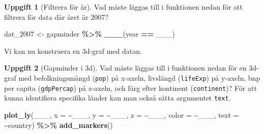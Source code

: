 \documentclass[
]{book}
\newenvironment{Shaded}{\begin{snugshade}}{\end{snugshade}}
\newcommand{\AttributeTok}[1]{\textcolor[rgb]{0.13,0.29,0.53}{#1}}
\newcommand{\FunctionTok}[1]{\textcolor[rgb]{0.13,0.29,0.53}{\textbf{#1}}}
\newcommand{\NormalTok}[1]{#1}
\newcommand{\OtherTok}[1]{\textcolor[rgb]{0.56,0.35,0.01}{#1}}
\newcommand{\SpecialCharTok}[1]{\textcolor[rgb]{0.81,0.36,0.00}{\textbf{#1}}}
\theoremstyle{definition}
\theoremstyle{definition}
\theoremstyle{definition}
\newtheorem{exercise}{Uppgift}[chapter]
\theoremstyle{definition}
\theoremstyle{remark}
\begin{document}
\begin{exercise}[Filtrera för år]

Vad måste läggas till i funktionen nedan för att filtrera för data där året är 2007?

\begin{Shaded}
\begin{Highlighting}[]
\NormalTok{dat\_2007 }\OtherTok{\textless{}{-}}\NormalTok{ gapminder }\SpecialCharTok{\%\textgreater{}\%} 
  \FunctionTok{\_\_\_}\NormalTok{(year }\SpecialCharTok{==}\NormalTok{ \_\_\_)}
\end{Highlighting}
\end{Shaded}

\end{exercise}

Vi kan nu konstruera en 3d-graf med datan.

\begin{exercise}[Gapminder i 3d]

Vad måste läggas till i funktionen nedan för en 3d-graf med befolkningsmängd (\texttt{pop}) på x-axeln, livslängd (\texttt{lifeExp}) på y-axeln, bnp per capita (\texttt{gdpPercap}) på z-axeln, och färg efter kontinent (\texttt{continent})? För att kunna identifiera specifika länder kan man också sätta argumentet \texttt{text}.

\begin{Shaded}
\begin{Highlighting}[]
\FunctionTok{plot\_ly}\NormalTok{(\_\_\_, }\AttributeTok{x =} \SpecialCharTok{\textasciitilde{}}\NormalTok{\_\_\_, }\AttributeTok{y =} \SpecialCharTok{\textasciitilde{}}\NormalTok{\_\_\_, }\AttributeTok{z =} \SpecialCharTok{\textasciitilde{}}\NormalTok{\_\_\_, }\AttributeTok{color =} \SpecialCharTok{\textasciitilde{}}\NormalTok{\_\_\_, }\AttributeTok{text =} \SpecialCharTok{\textasciitilde{}}\NormalTok{country) }\SpecialCharTok{\%\textgreater{}\%} 
  \FunctionTok{add\_markers}\NormalTok{()}
\end{Highlighting}
\end{Shaded}

\end{exercise}
\end{document}
